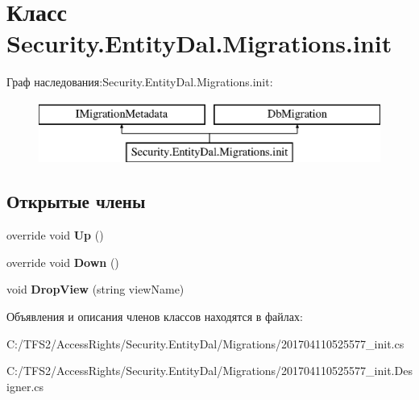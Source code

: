 \hypertarget{class_security_1_1_entity_dal_1_1_migrations_1_1init}{}\section{Класс Security.\+Entity\+Dal.\+Migrations.\+init}
\label{class_security_1_1_entity_dal_1_1_migrations_1_1init}
Граф наследования\+:Security.\+Entity\+Dal.\+Migrations.\+init\+:\begin{figure}[H]
\begin{center}
\leavevmode
\includegraphics[height=2.000000cm]{da/d86/class_security_1_1_entity_dal_1_1_migrations_1_1init}
\end{center}
\end{figure}
\subsection*{Открытые члены}
\begin{DoxyCompactItemize}
\item 
\mbox{\label{class_security_1_1_entity_dal_1_1_migrations_1_1init_a0551f81ada248c91c96cc7924e70cb80}} 
override void {\bfseries Up} ()
\item 
\mbox{\label{class_security_1_1_entity_dal_1_1_migrations_1_1init_ac5780ed4b3feb373fb0fc1ff03e2561e}} 
override void {\bfseries Down} ()
\item 
\mbox{\label{class_security_1_1_entity_dal_1_1_migrations_1_1init_a3de8126f244c5bf3fae008842c9672c4}} 
void {\bfseries Drop\+View} (string view\+Name)
\end{DoxyCompactItemize}


Объявления и описания членов классов находятся в файлах\+:\begin{DoxyCompactItemize}
\item 
C\+:/\+T\+F\+S2/\+Access\+Rights/\+Security.\+Entity\+Dal/\+Migrations/201704110525577\+\_\+init.\+cs\item 
C\+:/\+T\+F\+S2/\+Access\+Rights/\+Security.\+Entity\+Dal/\+Migrations/201704110525577\+\_\+init.\+Designer.\+cs\end{DoxyCompactItemize}
